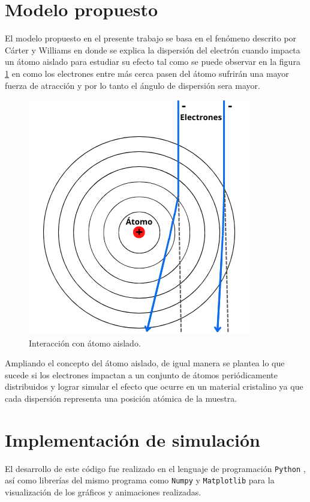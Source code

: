 \documentclass[3pt,twocolumn]{elsarticle}
\begin{document}
\section{Modelo propuesto}
El modelo propuesto en el presente trabajo se basa en el fenómeno descrito por Cárter y Williams \cite{tem} en donde se explica la dispersión del electrón cuando impacta un átomo aislado para estudiar su efecto tal como se puede observar en la figura \ref{atomo} en como los electrones entre más cerca pasen del átomo sufrirán una mayor fuerza de atracción y por lo tanto el ángulo de dispersión sera mayor.  
\begin{figure}[h!]
    \centering
    \includegraphics[scale=.65]{atomo.png}
    \caption{Interacción con átomo aislado.}
    \label{atomo}
\end{figure}
Ampliando el concepto del átomo aislado, de igual manera se plantea lo que sucede si los electrones impactan a un conjunto de átomos periódicamente distribuidos y lograr simular el efecto que ocurre en un material cristalino ya que cada dispersión representa una posición atómica de la muestra.

\section{Implementación de simulación}
El desarrollo de este código fue realizado en el lenguaje de programación \texttt{Python} \cite{Python}, así como librerías del mismo programa como \texttt{Numpy} \cite{numpy} y \texttt{Matplotlib} \cite{matplotlib} para la visualización de los gráficos y animaciones realizadas.
\end{document}
